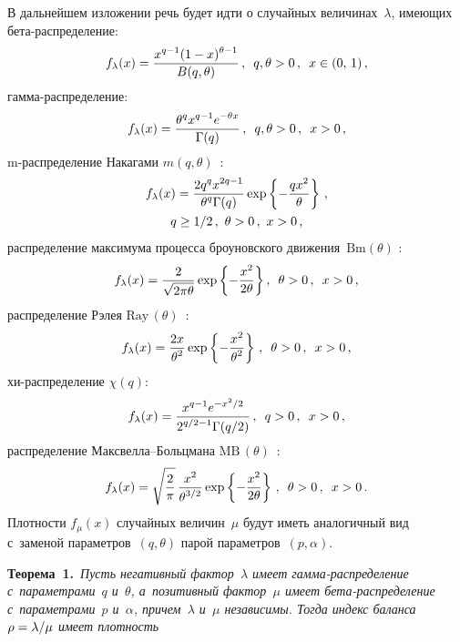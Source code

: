 \begin{multicols}{2}
В дальнейшем изложении речь будет идти о случайных величинах~$\lambda$, 
имеющих бе\-та-рас\-пре\-де\-ле\-ние:
$$
f_\lambda(x)=\displaystyle\frac{\displaystyle x^{q-1}(1-x)^{\theta-1}\mathstrut}{\displaystyle B(q,\theta)\mathstrut}\,,\enskip
q,\theta>0\,, \enskip x\in(0,\,1)\,,
$$
гамма-распределение:
$$
f_\lambda(x)=\displaystyle\frac{\displaystyle \theta^q x^{q-1}e^{-\theta x}\mathstrut}{\displaystyle \Gamma(q)\mathstrut}\,,\enskip 
q,\theta>0\,, \enskip x>0\,,
$$
m-распределение Накагами $m(q,\theta)$~\cite{Naka1960}:
\begin{multline}
\label{Density_lambda_m}
f_\lambda(x)=\displaystyle\frac{\displaystyle 2 q^q x^{2q-1}\mathstrut}{\displaystyle \theta^q\Gamma(q)\mathstrut}
\exp\left\{- \displaystyle\frac{\displaystyle q x^2\mathstrut}{\displaystyle \theta\mathstrut}\right\}\,,\\ 
q\ge1/2\,,\ \theta>0\,, \  x>0\,,
\end{multline}
распределение максимума процесса броуновского движения~$\mathrm{Bm}(\theta)$ \cite{Kruglov2016}:
\begin{equation}
\label{Density_lambda_Bm}
f_\lambda(x)=\displaystyle\frac{\displaystyle 2 \mathstrut}{\displaystyle \sqrt{2\pi\theta}\mathstrut}
\exp\left\{- \displaystyle\frac{\displaystyle x^2\mathstrut}{\displaystyle 2\theta\mathstrut}\right\},\enskip \theta>0\,, \enskip x>0\,,
\end{equation}
распределение Рэлея $\mathrm{Ray}\,(\theta)$~\cite{Siddiqui1964}:
\begin{equation}
\label{Density_lambda_Ray}
f_\lambda(x)=\displaystyle\frac{\displaystyle 2 x\mathstrut}{\displaystyle \theta^2\mathstrut}\exp\left\{-  
\displaystyle\frac{\displaystyle x^2\mathstrut}{\displaystyle \theta^2\mathstrut}\right\}\,,\enskip \theta>0\,, \enskip x>0\,,
\end{equation}
хи-распределение $\chi(q)$:
\begin{equation}
\label{Density_lambda_chi}
f_\lambda(x)=\displaystyle\frac{\displaystyle x^{q-1}e^{- x^2/2}\mathstrut}{\displaystyle 2^{q/2-1}\Gamma(q/2)\mathstrut}\,,\enskip
q>0\,, \enskip x>0\,,
\end{equation}
распределение Максвелла--Больц\-ма\-на $\mathrm{MB}\,(\theta)$~\cite{Mandl2008}:
\begin{equation}
\label{Density_lambda_MB}
f_\lambda(x)=\sqrt{\displaystyle\frac{\displaystyle 2\mathstrut}{\displaystyle \pi\mathstrut}}\,
\displaystyle\frac{\displaystyle x^2\mathstrut}{\displaystyle \theta^{3/2}\mathstrut}\exp\left\{-  \displaystyle\frac{\displaystyle x^2\mathstrut}{\displaystyle 2\theta\mathstrut}\right\}\,,\enskip
\theta>0\,, \enskip x>0\,.
\end{equation}
Плотности $f_\mu(x)$ случайных величин~$\mu$ будут иметь аналогичный вид с~заменой 
па\-ра\-мет\-ров~$(q,\theta)$ парой па\-ра\-мет\-ров~$(p,\alpha)$.

\smallskip

\noindent
\textbf{Теорема~1.}\ 
\textit{Пусть негативный фактор~$\lambda$ имеет гам\-ма-рас\-пре\-де\-ле\-ние 
с~параметрами~$q$ и~$\theta$, а~позитивный фактор~$\mu$ имеет бе\-та-рас\-пре\-де\-ле\-ние 
с~параметрами~$p$ и~$\alpha$, причем~$\lambda$ и~$\mu$ независимы. 
Тогда индекс баланса $\rho\hm=\lambda/\mu$ имеет плот\-ность}


\end{multicols}

